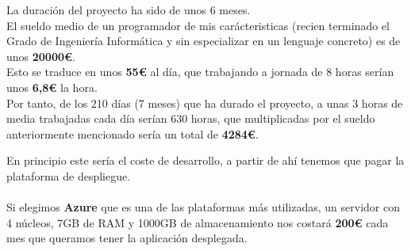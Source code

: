 La duración del proyecto ha sido de unos 6 meses.\\

El sueldo medio de un programador \cite{sueldo} de mis carácteristicas (recien terminado el Grado de Ingeniería Informática y sin especializar en un lenguaje concreto) es de unos \textbf{20000\euro}.\\
Esto se traduce en unos \textbf{55\euro} al día, que trabajando a jornada de 8 horas serían unos \textbf{6,8\euro} la hora.\\

Por tanto, de los 210 días (7 meses) que ha durado el proyecto, a unas 3 horas de media trabajadas cada día serían 630 horas, que multiplicadas por el sueldo anteriormente mencionado sería un total de \textbf{4284\euro}.

En principio este sería el coste de desarrollo, a partir de ahí tenemos que pagar la plataforma de despliegue.\\ \\
Si elegimos \textbf{Azure} \cite{azure} que es una de las plataformas más utilizadas, un servidor con 4 núcleos, 7GB de RAM y 1000GB de almacenamiento nos costará \textbf{200\euro} cada mes que queramos tener la aplicación desplegada.\\

